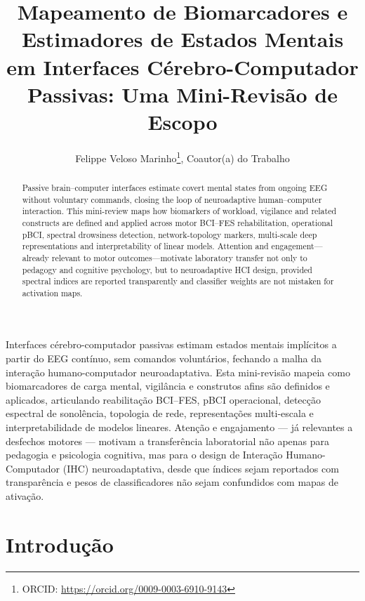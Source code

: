 \documentclass[12pt]{article}
\title{Mapeamento de Biomarcadores e Estimadores de Estados Mentais em Interfaces C\'{e}rebro-Computador Passivas: Uma Mini-Revis\~{a}o de Escopo}
\author{Felippe Veloso Marinho\inst{1}\thanks{ORCID: \url{https://orcid.org/0009-0003-6910-9143}},
        Coautor(a) do Trabalho\inst{1}}
\begin{document}
\maketitle

\begin{abstract}
Passive brain--computer interfaces estimate covert mental states from ongoing EEG without voluntary commands, closing the loop of neuroadaptive human--computer interaction. This mini-review maps how biomarkers of workload, vigilance and related constructs are defined and applied across motor BCI--FES rehabilitation, operational pBCI, spectral drowsiness detection, network-topology markers, multi-scale deep representations and interpretability of linear models. Attention and engagement---already relevant to motor outcomes---motivate laboratory transfer not only to pedagogy and cognitive psychology, but to neuroadaptive HCI design, provided spectral indices are reported transparently and classifier weights are not mistaken for activation maps.
\end{abstract}

\begin{resumo}
Interfaces c\'{e}rebro-computador passivas estimam estados mentais impl\'{i}citos a partir do EEG cont\'{i}nuo, sem comandos volunt\'{a}rios, fechando a malha da intera\c{c}\~{a}o humano-computador neuroadaptativa. Esta mini-revis\~{a}o mapeia como biomarcadores de carga mental, vigil\^{a}ncia e construtos afins s\~{a}o definidos e aplicados, articulando reabilita\c{c}\~{a}o BCI--FES, pBCI operacional, detec\c{c}\~{a}o espectral de sonol\^{e}ncia, topologia de rede, representa\c{c}\~{o}es multi-escala e interpretabilidade de modelos lineares. Aten\c{c}\~{a}o e engajamento --- j\'{a} relevantes a desfechos motores --- motivam a transfer\^{e}ncia laboratorial n\~{a}o apenas para pedagogia e psicologia cognitiva, mas para o design de Intera\c{c}\~{a}o Humano-Computador (IHC) neuroadaptativa, desde que \'{i}ndices sejam reportados com transpar\^{e}ncia e pesos de classificadores n\~{a}o sejam confundidos com mapas de ativa\c{c}\~{a}o.
\end{resumo}

\section{Introdu\c{c}\~{a}o}
\end{document}
